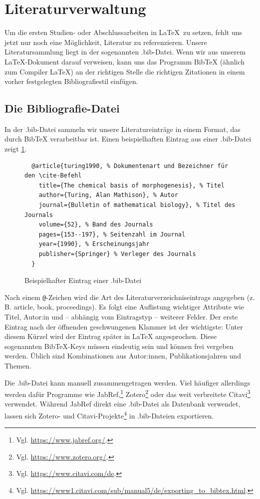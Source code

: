 \section{Literaturverwaltung}
\label{sec:literature}

Um die ersten Studien- oder Abschlussarbeiten in \LaTeX\ zu setzen, fehlt uns jetzt nur noch eine Möglichkeit, Literatur zu referenzieren.
Unsere Literatursammlung liegt in der sogenannten .bib-Datei.
Wenn wir aus unserem \LaTeX-Dokument darauf verweisen, kann uns das Programm Bib\TeX{} (ähnlich zum Compiler \LaTeX) an der richtigen Stelle die richtigen Zitationen in einem vorher festgelegten Bibliografiestil einfügen.

\subsection{Die Bibliografie-Datei}
In der .bib-Datei sammeln wir unsere Literatureinträge in einem Format, das durch Bib\TeX{} verarbeitbar ist.
Einen beispielhaften Eintrag aus einer .bib-Datei zeigt \cref{lst:bibfile-sample-entry}.

\begin{figure}[H]
  \begin{verbatim}
  @article{turing1990, % Dokumentenart und Bezeichner für den \cite-Befehl
    title={The chemical basis of morphogenesis}, % Titel
    author={Turing, Alan Mathison}, % Autor
    journal={Bulletin of mathematical biology}, % Titel des Journals
    volume={52}, % Band des Journals
    pages={153--197}, % Seitenzahl im Journal
    year={1990}, % Erscheinungsjahr
    publisher={Springer} % Verleger des Journals
  }
  \end{verbatim}
  \caption{Beispielhafter Eintrag einer .bib-Datei}
  \label{lst:bibfile-sample-entry}
\end{figure}

Nach einem \texttt{@}-Zeichen wird die Art des Literaturverzeichniseintrags angegeben (z.\,B. article, book, proceedings).
Es folgt eine Auflistung wichtiger Attribute wie Titel, Autor:in und – abhängig vom Eintragstyp – weiterer Felder.
Der erste Eintrag nach der öffnenden geschwungenen Klammer ist der wichtigste: 
Unter diesem Kürzel wird der Eintrag später in \LaTeX{} angesprochen.
Diese sogenannten Bib\TeX-Keys müssen eindeutig sein und können frei vergeben werden.
Üblich sind Kombinationen aus Autor:innen, Publikationsjahren und Themen.

Die .bib-Datei kann manuell zusammengetragen werden.
Viel häufiger allerdings werden dafür Programme wie JabRef,\footnote{Vgl. \url{https://www.jabref.org/}.} Zotero\footnote{Vgl. \url{https://www.zotero.org/}.} oder das weit verbreitete Citavi\footnote{Vgl. \url{https://www.citavi.com/de}.} verwendet.
Während JabRef direkt eine .bib-Datei als Datenbank verwendet, lassen sich Zotero- und Citavi-Projekte\footnote{Vgl. \url{https://www1.citavi.com/sub/manual5/de/exporting_to_bibtex.html}.} in .bib-Dateien exportieren.

